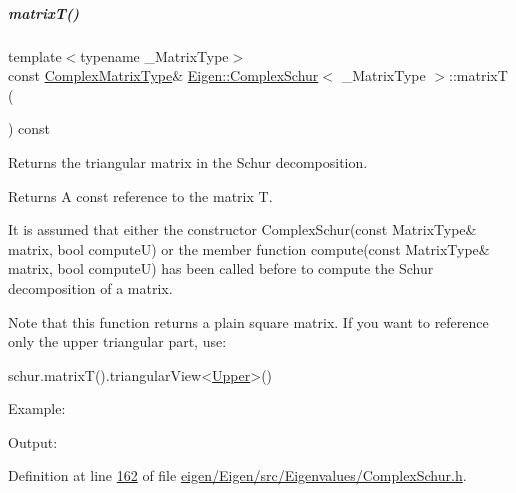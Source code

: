 \mbox{\label{group___eigenvalues___module_add3ab5ed83f7f2f06b79fa910a2d5684}} 
\subparagraph{\texorpdfstring{matrix\+T()}{matrixT()}\hspace{0.1cm}{\footnotesize\ttfamily [2/2]}}
{\footnotesize\ttfamily template$<$typename \+\_\+\+Matrix\+Type$>$ \\
const \hyperlink{group___eigenvalues___module_af61fe57877d51cfb50178f78534042f0}{Complex\+Matrix\+Type}\& \hyperlink{group___eigenvalues___module_class_eigen_1_1_complex_schur}{Eigen\+::\+Complex\+Schur}$<$ \+\_\+\+Matrix\+Type $>$\+::matrixT (\begin{DoxyParamCaption}{ }\end{DoxyParamCaption}) const\hspace{0.3cm}{\ttfamily [inline]}}



Returns the triangular matrix in the Schur decomposition. 

\begin{DoxyReturn}{Returns}
A const reference to the matrix T.
\end{DoxyReturn}
It is assumed that either the constructor Complex\+Schur(const Matrix\+Type\& matrix, bool compute\+U) or the member function compute(const Matrix\+Type\& matrix, bool compute\+U) has been called before to compute the Schur decomposition of a matrix.

Note that this function returns a plain square matrix. If you want to reference only the upper triangular part, use\+: 
\begin{DoxyCode}
schur.matrixT().triangularView<\hyperlink{group__enums_gga39e3366ff5554d731e7dc8bb642f83cda6bcb58be3b8b8ec84859ce0c5ac0aaec}{Upper}>() 
\end{DoxyCode}


Example\+: 
\begin{DoxyCodeInclude}
\end{DoxyCodeInclude}
 Output\+: 
\begin{DoxyVerbInclude}
\end{DoxyVerbInclude}
 

Definition at line \hyperlink{eigen_2_eigen_2src_2_eigenvalues_2_complex_schur_8h_source_l00162}{162} of file \hyperlink{eigen_2_eigen_2src_2_eigenvalues_2_complex_schur_8h_source}{eigen/\+Eigen/src/\+Eigenvalues/\+Complex\+Schur.\+h}.

